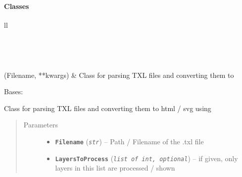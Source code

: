\documentclass[letterpaper,10pt,english]{sphinxmanual}
\begin{document}
\paragraph{Classes}
\label{Chapters/PythonModuleReference/TXLConverter/TXLWizard.TXLConverter:classes}
\begin{longtable}{ll}
\hline
\endfirsthead

%
{{}} \\
\hline
\endhead

\hline {} \\ \hline
\endfoot

\endlastfoot


{\hyperref[Chapters/PythonModuleReference/TXLConverter/TXLWizard.TXLConverter:TXLWizard.TXLConverter.TXLConverter]{}}(Filename, **kwargs)
 & 
Class for parsing TXL files and converting them to
\\
\hline\end{longtable}


\begin{fulllineitems}
\label{Chapters/PythonModuleReference/TXLConverter/TXLWizard.TXLConverter:TXLWizard.TXLConverter.TXLConverter}
Bases: 

Class for parsing TXL files and converting them to
html / svg using {\hyperref[Chapters/PythonModuleReference/TXLWriter/TXLWizard.TXLWriter:module\string-TXLWizard.TXLWriter]{}}
\begin{quote}\begin{description}
\item[{Parameters}] \leavevmode\begin{itemize}
\item {} 
\textbf{\texttt{Filename}} (\emph{\texttt{str}}) -- Path / Filename of the .txl file

\item {} 
\textbf{\texttt{LayersToProcess}} (\emph{\texttt{list of int, optional}}) -- if given, only layers in this list are processed / shown

\end{itemize}

\end{description}\end{quote}

\end{fulllineitems}
\end{document}

